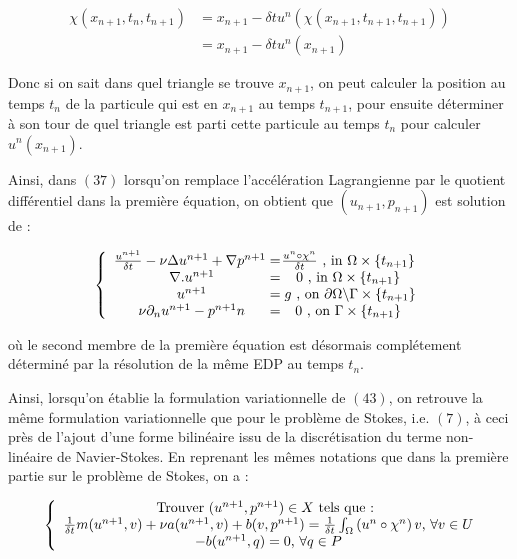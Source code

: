 \documentclass[a4paper,12pt]{article}
\begin{document}
\begin{equation*}
\begin{split}
\chi (x_{n+1},t_n,t_{n+1}) & = x_{n+1} - \delta t u^n \left( \chi (x_{n+1},t_{n+1},t_{n+1}) \right) \\
& = x_{n+1} - \delta t u^n ( x_{n+1} ) 
\end{split}
\end{equation*}

Donc si on sait dans quel triangle se trouve $x_{n+1}$, on peut calculer la position au temps $t_n$ de la particule qui est en $x_{n+1}$ au temps $t_{n+1}$, pour ensuite déterminer à son tour de quel triangle est parti cette particule au temps $t_n$ pour calculer $u^n (x_{n+1})$.

Ainsi, dans $(37)$ lorsqu'on remplace l'accélération Lagrangienne par le quotient différentiel dans la première équation, on obtient que $(u_{n+1},p_{n+1})$ est solution de :

\begin{equation}
\left \{
\begin{array}{c @{ = } c}
 \frac{u^{n+1} }{\delta t} -\nu \Delta u^{n+1}  + \nabla p^{n+1}  \; & \frac{u^n \circ \chi^n }{\delta t} \text{ , in } \Omega \times \{t_{n+1}\} \\
\nabla . u^{n+1}  & 0 \text{ , in } \Omega \times \{t_{n+1}\} \\
u^{n+1} & \; g \text{ , on } \partial\Omega \backslash \Gamma \times \{t_{n+1}\} \\
\nu\partial_{n}u^{n+1} - p^{n+1} n & 0 \text{ , on } \Gamma \times \{t_{n+1}\} \\
\end{array}
\right.
\end{equation}

où le second membre de la première équation est désormais complétement déterminé par la résolution de la même EDP au temps $t_n$.

Ainsi, lorsqu'on établie la formulation variationnelle de $(43)$, on retrouve la même formulation variationnelle que pour le problème de Stokes, i.e. $(7)$, à ceci près de l'ajout d'une forme bilinéaire issu de la discrétisation du terme non-linéaire de Navier-Stokes. En reprenant les mêmes notations que dans la première partie sur le problème de Stokes, on a :

\begin{equation}
\left \{
\begin{array}{c @{} c}
\text{Trouver } (u^{n+1},p^{n+1}) \in X \text{ tels que : } \\
\frac{1}{\delta t} m(u^{n+1},v) + \nu a(u^{n+1},v) + b(v,p^{n+1}) = \frac{1}{\delta t} \int_{\Omega} \left( u^n \circ \chi^n \right)  v \text{, } \forall v \in U \\
-b(u^{n+1},q) = 0 \text{, } \forall q \in P\\
\end{array}
\right.
\end{equation}
\end{document}
